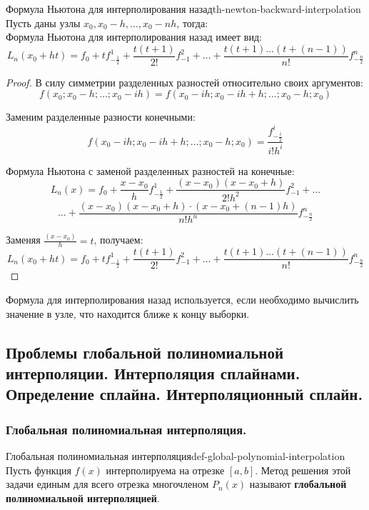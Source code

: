 \documentclass[14pt]{extarticle}
\begin{document}
    \clearpage
    \begin{theorem}{Формула Ньютона для интерполирования назад}{th-newton-backward-interpolation}
        Пусть даны узлы $x_{0}, x_{0} - h, \ldots, x_{0} - nh$, тогда:\\

        Формула Ньютона для интерполирования назад имеет вид:
        $$L_{n}(x_{0} + ht) = f_{0} + tf_{-\frac{1}{2}}^{1} + \frac{t(t+1)}{2!}f_{-1}^{2} + \ldots + \frac{t(t+1)\ldots(t+(n - 1))}{n!}f_{-\frac{n}{2}}^{n}$$

        \begin{proof}
            В силу симметрии разделенных разностей относительно своих аргументов:
            $$f(x_{0}; x_{0} - h; \ldots; x_{0} - ih) = f(x_{0} - ih; x_{0} - ih + h; \ldots; x_{0} - h; x_{0})$$

            Заменим разделенные разности конечными:
            $$f(x_{0} - ih; x_{0} - ih + h; \ldots; x_{0} - h; x_{0}) = \frac{f_{-\frac{i}{2}}^{i}}{i!h^{i}}$$

            Формула Ньютона с заменой разделенных разностей на конечные:
            $$L_{n}(x) = f_{0} + \frac{x - x_{0}}{h}f_{-\frac{1}{2}}^{1} + \frac{(x - x_{0})(x - x_{0} +h)}{2!h^{2}}f_{-1}^{2} + \ldots$$ 
            $$\ldots + \frac{(x - x_{0})(x - x_{0} + h) \cdot (x-x_{0} + (n-1)h)}{n! h^{n}}f_{-\frac{n}{2}}^{n}$$

            Заменяя $\frac{(x - x_{0})}{h} = t$, получаем:
            $$L_{n}(x_{0} + ht) = f_{0} + tf_{-\frac{1}{2}}^{1} + \frac{t(t+1)}{2!}f_{-1}^{2} + \ldots + \frac{t(t+1)\ldots(t+(n - 1))}{n!}f_{-\frac{n}{2}}^{n}$$
        \end{proof}
    \end{theorem}

    Формула для интерполирования назад используется, если необходимо вычислить значение в узле, что находится ближе к концу выборки.

\clearpage
\subsection{Проблемы глобальной полиномиальной интерполяции. Интерполяция сплайнами. Определение сплайна. Интерполяционный сплайн.}

    \subsubsection{Глобальная полиномиальная интерполяция.}

        \begin{definition}{Глобальная полиномиальная интерполяция}{def-global-polynomial-interpolation}
            Пусть функция $f(x)$ интерполируема на отрезке $[a, b]$. Метод решения этой задачи единым для всего отрезка многочленом $P_{n}(x)$ называют \textbf{глобальной полиномиальной интерполяцией}.
        \end{definition}
\end{document}
